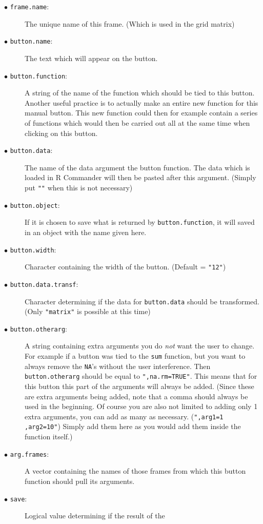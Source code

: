 \documentclass[a4paper]{article}\usepackage[]{graphicx}\usepackage[]{color}
\begin{document}
\begin{description}
  \item[$\bullet$ \texttt{frame.name}:] The unique name of this frame. (Which is used in the grid matrix)
  \item[$\bullet$ \texttt{button.name}:] The text which will appear on the
  button. 
  \item[$\bullet$ \texttt{button.function}:] A string of the name of the
  function which should be tied to this button. Another useful practice is to actually make an entire
  new function for this manual button. This new function could then for
  example contain a series of functions which would then be carried
  out all at the same time when clicking on this button.
  \item[$\bullet$ \texttt{button.data}:] The name of the data argument the
  button function. The data which is loaded in R Commander will then be
  pasted after this argument. (Simply put \verb|""| when this is not necessary)
  \item[$\bullet$ \texttt{button.object}:] If it is chosen to save what is
  returned by \verb|button.function|, it will saved in an object with the name
  given here.
  \item[$\bullet$ \texttt{button.width}:] Character containing the width of the
  button. (Default = \verb|"12"|)
  \item[$\bullet$ \texttt{button.data.transf}:] Character determining if the
  data for \verb|button.data| should be transformed. (Only \verb|"matrix"| is
  possible at this time)
  \item[$\bullet$ \texttt{button.otherarg}:] A string containing extra arguments you
  do {\it not} want the user to change. For example if a button was tied to the
  \verb|sum| function, but you want to always remove the \verb|NA|'s without the
  user interference. Then \verb|button.otherarg| should be equal to
  \verb|",na.rm=TRUE"|. This means that for this button this part of the
  arguments will always be added. (Since these are extra arguments being added,
  note that a comma should always be used in the beginning. Of course you are
  also not limited to adding only 1 extra arguments, you can add as many as
  necessary. (\verb|",arg1=1 ,arg2=10"|) Simply add them here as you would add
  them inside the function itself.)
  \item[$\bullet$ \texttt{arg.frames}:] A vector containing the names of those
  frames from which this button function should pull its arguments.
  \item[$\bullet$ \texttt{save}:] Logical value determining if the result of the

\end{description}
\end{document}
